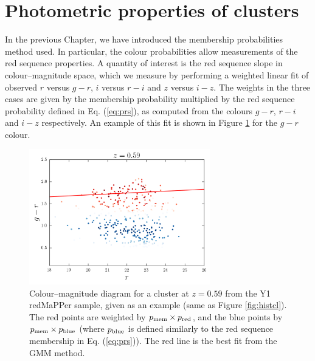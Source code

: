 {\section{Photometric properties of clusters}\label{sec:clproperties}

In the previous Chapter, we have introduced the membership probabilities method used. In particular, the colour probabilities allow measurements of the red sequence properties. A quantity of interest is the red sequence slope in colour--magnitude space, which we measure by performing a weighted linear fit of observed $r$ versus $g-r$, $i$ versus $r-i$ and $z$ versus $i-z$. The weights in the three cases are given by the membership probability multiplied by the red sequence probability defined in Eq. (\ref{eq:prs}), as computed from the colours $g-r$, $r-i$ and $i-z$ respectively. An example of this fit is shown in Figure \ref{fig:slopecl} for the $g-r$ colour.

\begin{figure}\centering
\includegraphics[width=0.7\textwidth]{./chapters/chapter6/figs/cl_test_rs.png}
\caption{Colour--magnitude diagram for a cluster at $z=0.59$ from the Y1 redMaPPer sample, given as an example (same as Figure \ref{fig:histcl}). The red points are weighted by $p_{\rm mem}\times p_{\rm red}$, and the blue points by $p_{\rm mem}\times p_{\rm blue}$ (where $p_{\rm blue}$ is defined similarly to the red sequence membership in Eq. (\ref{eq:prs})). The red line is the best fit from the GMM method.}\label{fig:slopecl}\end{figure}

}
